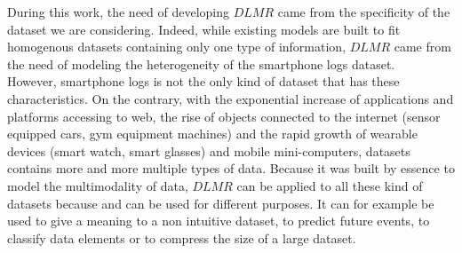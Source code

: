 During this work, the need of developing $DLMR$ came from the specificity of the dataset we are considering. Indeed, while existing models are built to fit homogenous datasets containing only one type of information, $DLMR$ came from the need of modeling the heterogeneity of the smartphone logs dataset.
\\However, smartphone logs is not the only kind of dataset that has these characteristics. On the contrary, with the exponential increase of applications and platforms accessing to web, the rise of objects connected to the internet (sensor equipped cars, gym equipment machines) and the rapid growth of wearable devices (smart watch, smart glasses) and mobile mini-computers, datasets contains more and more multiple types of data. Because it was built by essence to model the multimodality of data, $DLMR$ can be applied to all these kind of datasets because and can be used for different purposes. It can for example be used to give a meaning to a non intuitive dataset, to predict future events, to classify data elements or to compress the size of a large dataset.

